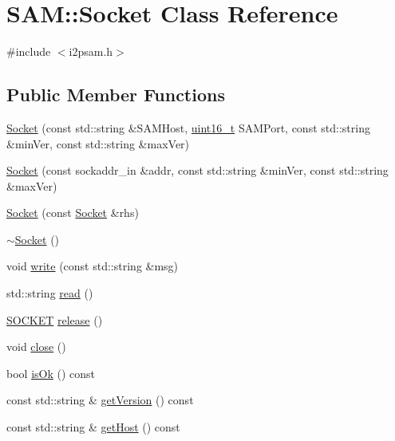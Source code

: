 \hypertarget{class_s_a_m_1_1_socket}{}\section{S\+A\+M\+:\+:Socket Class Reference}
\label{class_s_a_m_1_1_socket}


{\ttfamily \#include $<$i2psam.\+h$>$}

\subsection*{Public Member Functions}
\begin{DoxyCompactItemize}
\item 
\hyperlink{class_s_a_m_1_1_socket_ab1373984617b43dc2108491181de49b3}{Socket} (const std\+::string \&S\+A\+M\+Host, \hyperlink{stdint_8h_a273cf69d639a59973b6019625df33e30}{uint16\+\_\+t} S\+A\+M\+Port, const std\+::string \&min\+Ver, const std\+::string \&max\+Ver)
\item 
\hyperlink{class_s_a_m_1_1_socket_a8198a7e58a724ed21c4b74d933fccce1}{Socket} (const sockaddr\+\_\+in \&addr, const std\+::string \&min\+Ver, const std\+::string \&max\+Ver)
\item 
\hyperlink{class_s_a_m_1_1_socket_a37bdef8fc2f5c74b84878372a924645a}{Socket} (const \hyperlink{class_s_a_m_1_1_socket}{Socket} \&rhs)
\item 
\hyperlink{class_s_a_m_1_1_socket_ae05c892b5b1dec9dc3d4e0db093cb48c}{$\sim$\+Socket} ()
\item 
void \hyperlink{class_s_a_m_1_1_socket_ae19e83b3127dc1560f164a05b1acd763}{write} (const std\+::string \&msg)
\item 
std\+::string \hyperlink{class_s_a_m_1_1_socket_a3455043c16c8ca5c64855e6ea3ff15e1}{read} ()
\item 
\hyperlink{namespace_s_a_m_a346e18b1c3780d27cc960b8a432dfdf7}{S\+O\+C\+K\+E\+T} \hyperlink{class_s_a_m_1_1_socket_a1ae8f5a54a2293338b29c83ba4e56934}{release} ()
\item 
void \hyperlink{class_s_a_m_1_1_socket_a4255f1f63449dfc32d012089ea73f5e7}{close} ()
\item 
bool \hyperlink{class_s_a_m_1_1_socket_a1455a6eec384bbdeda6382f33b49843b}{is\+Ok} () const 
\item 
const std\+::string \& \hyperlink{class_s_a_m_1_1_socket_a513c5e443cd8c6265520a7602ab678c3}{get\+Version} () const 
\item 
const std\+::string \& \hyperlink{class_s_a_m_1_1_socket_abfd0ebd986ade7cb5f1dbdf0ae46ef29}{get\+Host} () const 

\end{DoxyCompactItemize}
